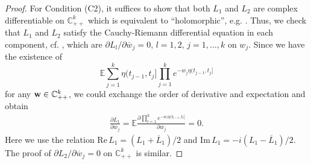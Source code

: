 \documentclass[11pt,leqno%
]{amsart}
\newcommand{\bfw}{{\bf w}}
\newcommand{\ov}{\overline}
\newcommand{\E }{{\mathbb E}}
\newcommand{\1}{{\mathbf 1}}
\begin{document}
\begin{proof}
For Condition (C2), it suffices to show that both $L_1$ and $L_2$ are
 complex differentiable on $\mathbb{C}^k_{++}$ which is equivalent to ``holomorphic'', e.g. 
\cite[Theorem 3.8, Ch.1]{grauert:fritzsche:1976}. Thus, we check that
 $L_1$ and $L_2$ satisfy the Cauchy-Riemann differential equation in
 each component, cf. \cite[Theorem 6.2, Ch.1]{grauert:fritzsche:1976},
 which are $\partial L_l/\partial \ov w_j=0,\,l=1,2,\,j=1,\ldots,k$ on
 $w_j$. Since we have the existence of 
\[
 \E \sum_{j=1}^k \eta(t_{j-1},t_j] \prod_{j=1}^k
 e^{-w_j\eta(t_{j-1},t_j]} 
\]
for any $\bfw\in\mathbb{C}_{++}^k$, we could exchange the order of
 derivative and expectation and obtain 
\begin{align*}
 \frac{\partial L_1}{\partial \overline w_j} = \E \frac{ \partial
  \prod_{l=1}^k e^{-w_l \eta(t_{l-1},t_l]}}{\partial \overline w_j}=0.
\end{align*}
Here we use the relation $\mathrm{Re}\,L_1=(L_1+\ov L_1)/2$ and
 $\mathrm{Im}\,L_1= -i(L_1-\ov L_1)/2$. The proof of $\partial
 L_2/\partial \ov w_j=0$ on $\mathbb{C}_{++}^k$ is similar. 


\end{proof}
\end{document}
